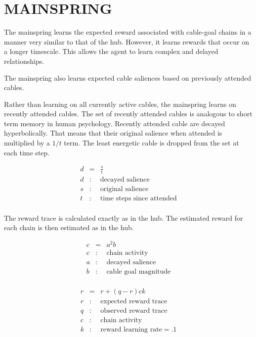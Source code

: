 \documentclass[oneside,twocolumn]{article}
\begin{document}
\section*{\color{copper} MAINSPRING}

The mainspring learns the expected reward associated with cable-goal chains in a manner very similar to that of the hub. However, it learns rewards that occur on a longer timescale. This allows the agent to learn complex and delayed relationships.

The mainspring also learns expected cable saliences based on previously attended cables.

Rather than learning on all currently active cables, the mainspring learns on recently attended cables. The set of recently attended cables is analogous to short term memory in human psychology. Recently attended cable are decayed hyperbolically. That means that their original salience when attended is multiplied by a $1/t$ term. The least energetic cable is dropped from the set at each time step.

\begin{eqnarray*}
d &= & \frac {s}{t} \\ 
d &:& \mbox{decayed salience} \\
s &:& \mbox{original salience} \\
t &:& \mbox{time steps since attended} \\
\end{eqnarray*}

The reward trace is calculated exactly as in the hub. The estimated reward for each chain is then estimated as in the hub.


\begin{eqnarray*}
c &= & a^2 b\\ 
c &:& \mbox{chain activity} \\
a &:& \mbox{decayed salience} \\
b &:& \mbox{cable goal magnitude}\\
\end{eqnarray*}

\begin{eqnarray*}
r &= & r + (q - r)c k \\ 
r &:& \mbox{expected reward trace} \\
q &:& \mbox{observed reward trace} \\
c &:& \mbox{chain activity} \\
k &:& \mbox{reward learning rate} = .1 \\
\end{eqnarray*}
\end{document}
